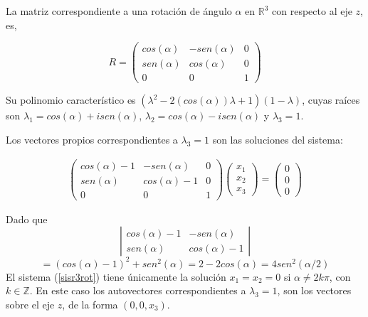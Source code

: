 \bigskip

\begin{example}
\noindent
La matriz correspondiente a una rotación de ángulo $\alpha$ en $\mathbb{R}^3$ con respecto al eje $z$, es,

$$R=\left(\begin{array}{ccc} cos(\alpha) & -sen(\alpha) &  0 \\ sen(\alpha) & cos(\alpha) & 0
\\ 0 & 0 & 1
\end{array}
 \right)$$

\bigskip

 Su polinomio característico es $  (\lambda^2 - 2 (cos(\alpha) )\lambda +1)(1-\lambda)$, cuyas raíces  son $\lambda_1= cos(\alpha) + i sen(\alpha)$, $\lambda_2= cos(\alpha) - i sen(\alpha)$ y $ \lambda_3= 1$.


\bigskip

Los vectores propios correspondientes a  $ \lambda_3= 1$ son las soluciones del sistema:
 
 \begin{eqnarray}
 \label{sisr3rot}
\left(\begin{array}{ccc} cos(\alpha) -1 & -sen(\alpha) &  0 \\ sen(\alpha) & cos(\alpha)-1 & 0
\\ 0 & 0 & 1
\end{array}
 \right)  \left(\begin{array}{c} x_1\\ x_2
\\ x_3
\end{array}
 \right) =  \left(\begin{array}{c} 0\\ 0
\\ 0
\end{array}
 \right) 
\end{eqnarray} 

 \bigskip
 
 Dado que 
\[
 \left|\begin{array}{cc}
 cos(\alpha)-1  & -sen(\alpha) \\
sen(\alpha) &  cos(\alpha)- 1 
\end{array}
\right|\]
\[=(cos(\alpha)- 1)^2+ sen^2(\alpha)= 2 - 2 cos(\alpha) =  4 sen^2 (\alpha /2 )
\]
El sistema (\ref{sisr3rot}) tiene únicamente la solución $x_1=x_2=0 $  si $ \alpha \neq 2k \pi $, con $k \in  \mathbb{Z}$. En este caso los autovectores correspondientes a $\lambda_3= 1$, son los vectores sobre el eje $z$, de la forma $(0,0,x_3)$.


\end{example}

